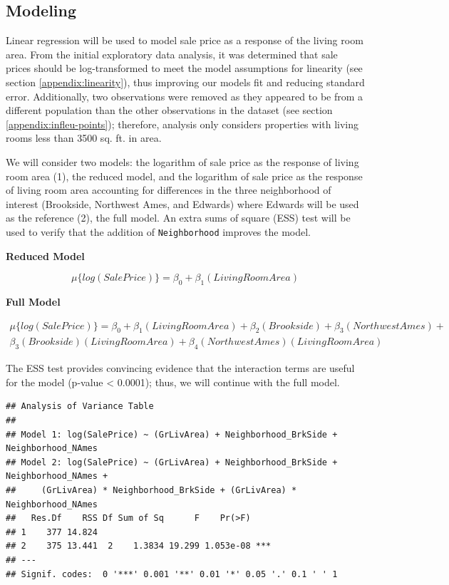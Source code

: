 \documentclass[american,]{article}
\begin{document}
\hypertarget{modeling}{%
\subsection{Modeling}\label{modeling}}

Linear regression will be used to model sale price as a response of the
living room area. From the initial exploratory data analysis, it was
determined that sale prices should be log-transformed to meet the model
assumptions for linearity (see section \ref{appendix:linearity}), thus
improving our models fit and reducing standard error. Additionally, two
observations were removed as they appeared to be from a different
population than the other observations in the dataset (see section
\ref{appendix:infleu-points}); therefore, analysis only considers
properties with living rooms less than 3500 sq. ft. in area.

We will consider two models: the logarithm of sale price as the response
of living room area (1), the reduced model, and the logarithm of sale
price as the response of living room area accounting for differences in
the three neighborhood of interest (Brookside, Northwest Ames, and
Edwards) where Edwards will be used as the reference (2), the full
model. An extra sums of square (ESS) test will be used to verify that
the addition of \texttt{Neighborhood} improves the model.

\textbf{Reduced Model}

\begin{equation}
\mu \lbrace log(SalePrice) \rbrace = \beta_0 + \beta_1(LivingRoomArea) \label{eq:reduced}
\end{equation}

\textbf{Full Model}

\begin{align}
\mu \lbrace log(SalePrice) \rbrace = \beta_0 + \beta_1(LivingRoomArea) +  \beta_2(Brookside) +\beta_3(NorthwestAmes) + \nonumber\\
\beta_3(Brookside)(LivingRoomArea) + \beta_4(NorthwestAmes)(LivingRoomArea) \label{eq:full}
\end{align}

The ESS test provides convincing evidence that the interaction terms are
useful for the model (p-value \textless{} 0.0001); thus, we will
continue with the full model.

\begin{verbatim}
## Analysis of Variance Table
## 
## Model 1: log(SalePrice) ~ (GrLivArea) + Neighborhood_BrkSide + Neighborhood_NAmes
## Model 2: log(SalePrice) ~ (GrLivArea) + Neighborhood_BrkSide + Neighborhood_NAmes + 
##     (GrLivArea) * Neighborhood_BrkSide + (GrLivArea) * Neighborhood_NAmes
##   Res.Df    RSS Df Sum of Sq      F    Pr(>F)    
## 1    377 14.824                                  
## 2    375 13.441  2    1.3834 19.299 1.053e-08 ***
## ---
## Signif. codes:  0 '***' 0.001 '**' 0.01 '*' 0.05 '.' 0.1 ' ' 1
\end{verbatim}
\end{document}
